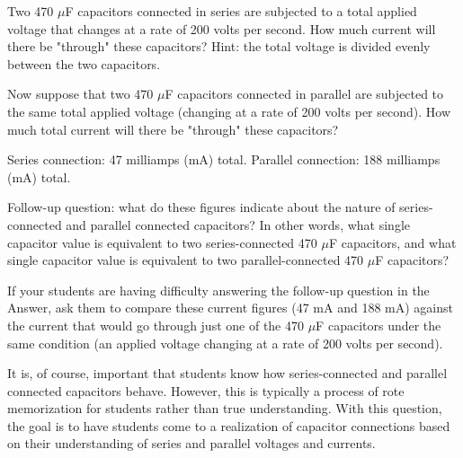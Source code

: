 

Two 470 $\mu$F capacitors connected in series are subjected to a total applied voltage that changes at a rate of 200 volts per second.  How much current will there be "through" these capacitors?  Hint: the total voltage is divided evenly between the two capacitors.

Now suppose that two 470 $\mu$F capacitors connected in parallel are subjected to the same total applied voltage (changing at a rate of 200 volts per second).  How much total current will there be "through" these capacitors?







Series connection: 47 milliamps (mA) total.  Parallel connection: 188 milliamps (mA) total.  

\vskip 10pt

Follow-up question: what do these figures indicate about the nature of series-connected and parallel connected capacitors?  In other words, what single capacitor value is equivalent to two series-connected 470 $\mu$F capacitors, and what single capacitor value is equivalent to two parallel-connected 470 $\mu$F capacitors?







If your students are having difficulty answering the follow-up question in the Answer, ask them to compare these current figures (47 mA and 188 mA) against the current that would go through just one of the 470 $\mu$F capacitors under the same condition (an applied voltage changing at a rate of 200 volts per second).

It is, of course, important that students know how series-connected and parallel connected capacitors behave.  However, this is typically a process of rote memorization for students rather than true understanding.  With this question, the goal is to have students come to a realization of capacitor connections based on their understanding of series and parallel voltages and currents.




